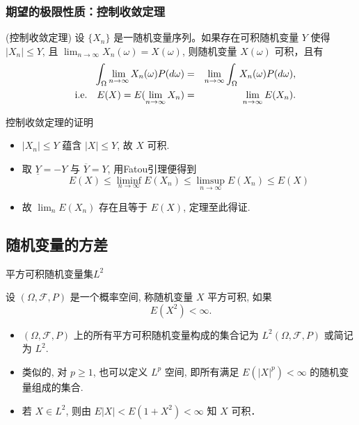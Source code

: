 \documentclass[Prob-All.tex]{subfiles}
\begin{document}
	\begin{frame}
		\frametitle{期望的极限性质：控制收敛定理}
		\begin{thm}
			(控制收敛定理) 设 $\{X_n\}$ 是一随机变量序列。如果存在可积随机变量 $Y$ 使得 $|X_n|\leq Y$, 且 $\lim_{n\rightarrow\infty} X_n (\omega)=X (\omega)$, 则随机变量 $X (\omega)$ 可积，且有
			\begin{eqnarray*}
				\int_{\Omega}\lim_{n\rightarrow\infty}X_n(\omega)P(d\omega)&=& \lim_{n\rightarrow\infty}\int_\Omega X_n(\omega)P(d\omega),\\
				\quad{\rm i.e.} \quad    E(X)=E(\lim_{n\rightarrow\infty}X_n)&=&\lim_{n\rightarrow\infty}E(X_n).
			\end{eqnarray*}

		\end{thm}

	\end{frame}
	\begin{frame}{控制收敛定理的证明}
		\begin{itemize}[<+-|alert@+>]
			\item  $\left|X_{n}\right| \leq Y$ 蕴含 $|X| \leq Y$, 故 $X$ 可积.
			\item 取 $\underline{Y}=-Y$ 与 $\overline{Y}=Y$, 用Fatou引理便得到
			\[
			E(X) \leq \liminf_{n\rightarrow\infty} E\left(X_{n}\right) \leq \limsup_{n\rightarrow\infty} E\left(X_{n}\right) \leq E(X)
			\]
			\item 故 $\lim _{n} E\left(X_{n}\right)$ 存在且等于 $E(X)$, 定理至此得证.
		\end{itemize}


	\end{frame}

	\subsection{随机变量的方差}


\begin{frame}{平方可积随机变量集$L^2$}
\begin{defi}
  设 $(\Omega, \mathcal{F}, P)$ 是一个概率空间, 称随机变量 $X$ 平方可积, 如果
  $$E\left(X^{2}\right)<\infty.$$
\end{defi}
\pause
\begin{rmk}
\begin{itemize}[<+-|alert@+>]
\item   $(\Omega, \mathcal{F}, P)$ 上的所有平方可积随机变量构成的集合记为 $L^{2}(\Omega, \mathcal{F}, P)$ 或简记为 $L^{2}$.
\item 类似的, 对 $p \geq 1$, 也可以定义 $L^{p}$ 空间, 即所有满足 $E(|X|^p) < \infty$ 的随机变量组成的集合.
\item 若 $X\in L^2$, 则由 $E|X|<E\left(1+X^{2}\right)<\infty$ 知 $X$ 可积．
\end{itemize}

\end{rmk}

\end{frame}
\end{document}
